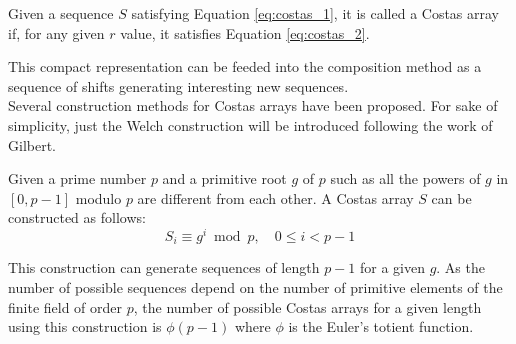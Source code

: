 \begin{definition}
  Given a sequence $S$ satisfying Equation \eqref{eq:costas_1}, it is called a
  Costas array if, for any given $r$ value, it satisfies Equation
  \eqref{eq:costas_2}.
\end{definition}

This compact representation can be feeded into the composition method as
a sequence of shifts generating interesting new
sequences\cite{moreno_costas}.\\

Several construction methods for Costas arrays have
been proposed. For sake of simplicity, just the Welch
construction will be introduced following the work of  Gilbert\cite{gilbert_costas}.

Given a prime number $p$ and a primitive root $g$ of $p$ such as all the powers of $g$ in $[0, p-1]$ modulo $p$ are different from each other.  A Costas array $S$
can be constructed as follows:
\begin{equation}
  S_{i} \equiv g^{i} \bmod p, \quad 0 \leq i <p-1
\end{equation}

This  construction can generate sequences of  length $p-1$ for a given $g$. As the number of possible sequences depend on the number of primitive
elements of the finite field of order $p$, the number of possible Costas arrays
for a given length using this construction is $\phi(p-1)$ where $\phi$ is the
Euler's totient function. 
